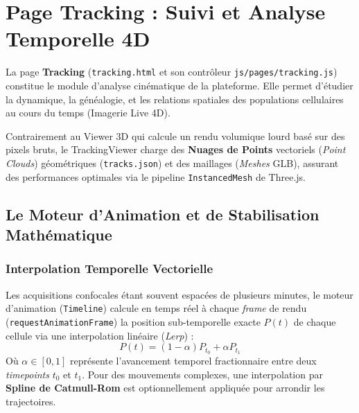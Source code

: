 \chapter{Page Tracking : Suivi et Analyse Temporelle 4D}
\label{chap:tracking}

La page \textbf{Tracking} (\texttt{tracking.html} et son contrôleur \texttt{js/pages/tracking.js}) constitue le module d'analyse cinématique de la plateforme. Elle permet d'étudier la dynamique, la généalogie, et les relations spatiales des populations cellulaires au cours du temps (Imagerie Live 4D).

Contrairement au Viewer 3D qui calcule un rendu volumique lourd basé sur des pixels bruts, le TrackingViewer charge des \textbf{Nuages de Points} vectoriels (\textit{Point Clouds}) géométriques (\texttt{tracks.json}) et des maillages (\textit{Meshes} GLB), assurant des performances optimales via le pipeline \texttt{InstancedMesh} de Three.js.

\section{Le Moteur d'Animation et de Stabilisation Mathématique}

\subsection{Interpolation Temporelle Vectorielle}

Les acquisitions confocales étant souvent espacées de plusieurs minutes, le moteur d'animation (\texttt{Timeline}) calcule en temps réel à chaque \textit{frame} de rendu (\texttt{requestAnimationFrame}) la position sub-temporelle exacte $P(t)$ de chaque cellule via une interpolation linéaire (\textit{Lerp}) :
\begin{equation}
P(t) = (1 - \alpha) P_{t_0} + \alpha P_{t_1}
\end{equation}
Où $\alpha \in [0, 1]$ représente l'avancement temporel fractionnaire entre deux \textit{timepoints} $t_0$ et $t_1$. Pour des mouvements complexes, une interpolation par \textbf{Spline de Catmull-Rom} est optionnellement appliquée pour arrondir les trajectoires.


